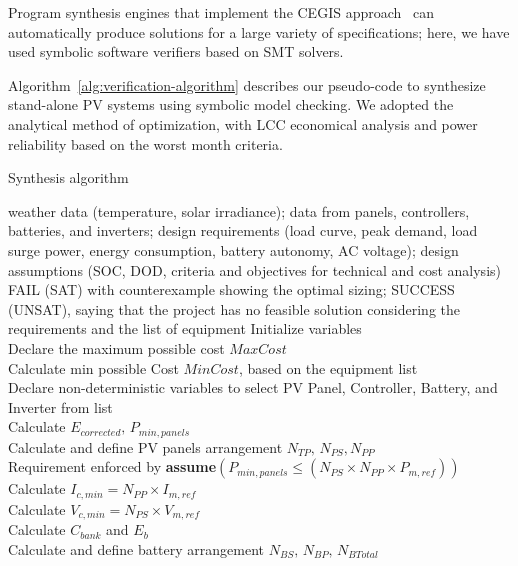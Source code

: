 \documentclass[journal]{IEEEtran}
\begin{document}
Program synthesis engines that implement the CEGIS approach~\cite{sketch} can automatically produce solutions for a large variety of specifications; here, we have used symbolic software verifiers based on SMT solvers.

Algorithm~\ref{alg:verification-algorithm} describes our pseudo-code to synthesize stand-alone PV systems using symbolic model checking. We adopted the analytical method of optimization, with LCC economical analysis and power reliability based on the worst month criteria.

 \begin{algorithm}
 \caption{Synthesis algorithm}
 \begin{algorithmic}[1]
 \begin{scriptsize}
 \renewcommand{\algorithmicrequire}{\textbf{Input:}}
 \renewcommand{\algorithmicensure}{\textbf{Output:}}
 \REQUIRE weather data (temperature, solar irradiance); data from panels, controllers, batteries, and inverters; design requirements (load curve, peak demand, load surge power, energy consumption, battery autonomy, AC voltage); design assumptions (SOC, DOD, criteria and objectives for technical and cost analysis)
 \ENSURE FAIL (SAT) with counterexample showing the optimal sizing; SUCCESS (UNSAT), saying that the project has no feasible solution considering the requirements and the list of equipment
 \STATE Initialize variables \\
 \STATE Declare the maximum possible cost $MaxCost$ \\
 \STATE Calculate min possible Cost $MinCost$, based on the equipment list \\
 	\STATE Declare non-deterministic variables to select PV Panel, Controller, Battery, and Inverter from list \\
 	\STATE Calculate $E_{corrected}, \, P_{min,panels} $ \\
	\STATE Calculate and define PV panels arrangement $N_{TP}, \, N_{PS}, N_{PP} $ \\
	\STATE Requirement enforced by \textbf{assume}$(P_{min,panels} \leq (N_{PS} \times N_{PP} \times P_{m,ref}))$ \\
	\STATE Calculate $I_{c,min} = N_{PP} \times I_{m,ref}$ \\
	\STATE Calculate $V_{c,min} = N_{PS} \times V_{m,ref}$ \\
 	\STATE Calculate $C_{bank}$ and $E_{b}$ \\
	\STATE Calculate and define battery arrangement $N_{BS}, \, N_{BP}, \, N_{BTotal}$ \\

\end{scriptsize}
\end{algorithmic}
\end{algorithm}
\end{document}

